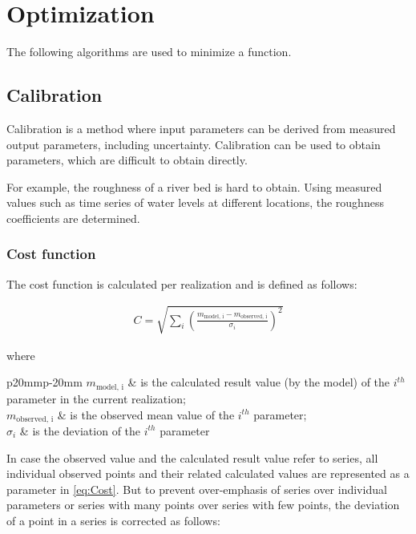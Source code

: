 \chapter{Optimization}
\label{sec:Optimization}

The following algorithms are used to minimize a function.

\ifdefined\PTKManual
\section{Calibration}
\label{sec:Calibration}

Calibration is a method where input parameters can be derived from measured output parameters,
including uncertainty.
Calibration can be used to obtain parameters, which are difficult to obtain directly.

For example, the roughness of a river bed is hard to obtain.
Using measured values such as time series of water levels at different locations,
the roughness coefficients are determined.

\subsection{Cost function}

The cost function is calculated per realization and is defined as follows:

\begin{align}
\label{eq:Cost}
C = \sqrt{\sum_i \left(\frac{m_{\text{model, i}} - m_{\text{observed, i}}}{\sigma_i}\right)^2}
\end{align}

where
\begin{longtable*}{p{20mm}p{\textwidth-24pt-20mm}}
	$m_{\text{model, i}}$ & is the calculated result value (by the model) of the $i^{th}$ parameter in the current realization; \\
	$m_{\text{observed, i}}$ & is the observed mean value of the $i^{th}$ parameter; \\
	$\sigma_i$ & is the deviation of the $i^{th}$ parameter \\
\end{longtable*}

In case the observed value and the calculated result value refer to series, all individual observed points and their related calculated values are represented as a parameter in \autoref{eq:Cost}. But to prevent over-emphasis of series over individual parameters or series with many points over series with few points, the deviation of a point in a series is corrected as follows:


